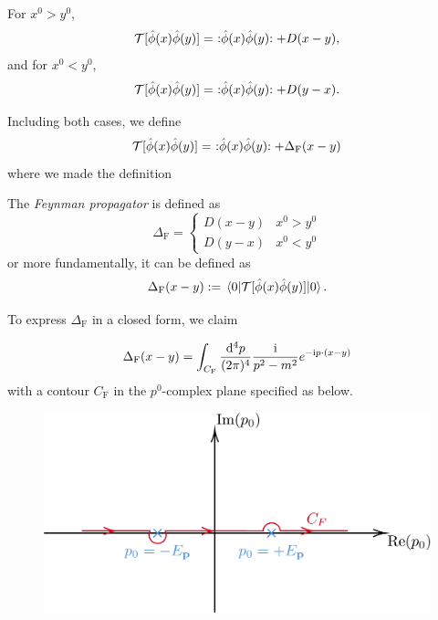 \documentclass[a4paper,11pt]{article}
\begin{document}
	For $x^0 > y^0$,
	\[
		\mathcal{T}[\hat \phi(x)\hat \phi(y)] =\ \nord{\hat \phi(x)\hat \phi(y)} + D(x-y),
	\]
	and for $x^0 < y^0$,
	\[
		\mathcal{T}[\hat \phi(x)\hat \phi(y)] =\ \nord{\hat \phi(x)\hat \phi(y)} + D(y-x).
	\]

	Including both cases, we define
	\[
		\mathcal{T}[\hat \phi(x)\hat \phi(y)] =\ \nord{\hat \phi(x)\hat \phi(y)} + \Delta_\text{F}(x-y)
	\]
	where we made the definition
	\begin{defi}
		The \emph{Feynman propagator} is defined as 
		\[
			\Delta _{\text{F}} = \begin{cases}
				D(x-y) & x^0 > y^0\\
				D(y-x) & x^0 < y^0
			\end{cases}
		\]
		or more fundamentally, it can be defined as 
		\begin{equation}
			\Delta_\text{F}(x-y) := \mel{0}{\mathcal{T}[\hat \phi(x)\hat \phi(y)]}{0}.
			\label{eq:3.2.3}
		\end{equation}
	\end{defi}

	To express $\Delta_\text{F}$ in a closed form, we claim
	\begin{clm}
		\begin{equation}
			\Delta_\text{F} (x-y) = \int _{C_\text{F}} \frac{\dd[4]{p}}{(2\pi)^{4}} \frac{\mathrm{i}}{p^2 - m^2} e ^{-\mathrm{i} p \cdot(x-y)}
		\end{equation}
		with a contour $C_\text{F}$ in the $p^0$-complex plane specified as below.
		\begin{figure}[H]
			\centering
			\includegraphics[width=0.65\linewidth]{fig/Feynman-contour.pdf}
		\end{figure}
	\end{clm}
	
\end{document}
